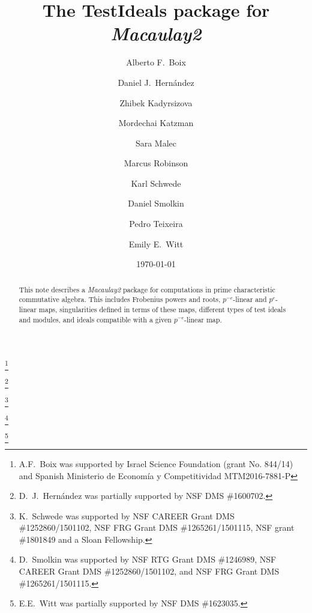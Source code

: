 \documentclass{amsart}
\begin{document}
\title{The  {TestIdeals} package for \emph{Macaulay2}}
\author[Alberto F.\ Boix et at.]{Alberto F.\ Boix}
\address{Department of Mathematics, Ben-Gurion University of the Negev, Beer-Sheva 8410501, Israel}
\thanks{A.F.~Boix was supported by Israel Science Foundation (grant No. 844/14) and Spanish Ministerio de Econom\'ia y Competitividad MTM2016-7881-P}

\author[]{Daniel J.\ Hern\'andez}
\address{Department of Mathematics, University of Kansas, Lawrence, KS~66045, USA}
\thanks{D.~J.~Hern\'andez was partially supported by NSF DMS \#1600702.}

\author[]{Zhibek Kadyrsizova}
\address{School of Science and Technology, Nazarbayev University, Astana, 010000, Republic of Kazakhstan}

\author[]{Mordechai Katzman}
\address{Department of Pure Mathematics, University of Sheffield, Sheffield S37RH, United Kingdom}

\author[]{Sara Malec}
\address{Department of Mathematics, Hood College, Frederick, MD 21701}

\author[]{Marcus Robinson}
\address{Department of Mathematics, University of Utah, Salt Lake City, UT~84112, USA}

\author[]{Karl Schwede}
\address{Department of Mathematics, University of Utah, Salt Lake City, UT~84112, USA}
\thanks{K.~Schwede was supported by NSF CAREER Grant DMS \#1252860/1501102, NSF FRG Grant DMS \#1265261/1501115, NSF grant \#1801849 and a Sloan Fellowship.}

\author[]{Daniel Smolkin}
\address{Department of Mathematics, University of Utah, Salt Lake City, UT~84112, USA}
\thanks{D.~Smolkin was supported by NSF RTG Grant DMS \#1246989, NSF CAREER Grant DMS \#1252860/1501102, and NSF FRG Grant DMS \#1265261/1501115.}

\author[]{Pedro Teixeira}
\address{Department of Mathematics, Knox College, Galesburg, IL~61401, USA}

\author[]{Emily E.\ Witt}
\address{Department of Mathematics, University of Kansas, Lawrence, KS~66045, USA}
\thanks{E.E.~Witt was partially supported by NSF DMS \#1623035.}
\date{\today}

\begin{abstract}
	This note describes a \emph{Macaulay2} package for computations in prime characteristic commutative algebra.  This includes Frobenius powers and roots, $p^{-e}$-linear and $p^{e}$-linear  maps,
  singularities defined in terms of these maps, different types of test ideals and modules, and ideals compatible with a given $p^{-e}$-linear map.
\end{abstract}
\end{document}
